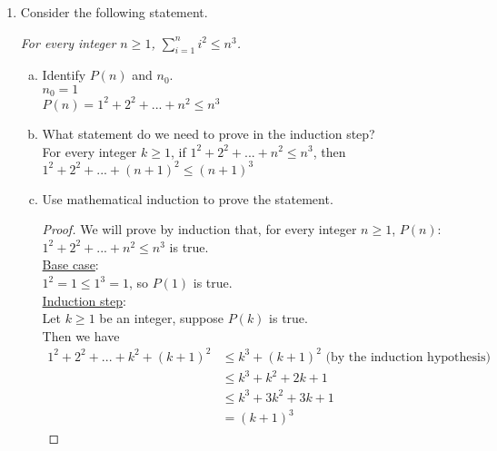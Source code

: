\documentclass[12pt]{amsart}
\begin{document}
\begin{enumerate}[{\bfseries 1.}]
\newpage
\item Consider the following statement.

	\vspace{0.1in}
	\begin{center}
	\noindent
	\textit{For every integer $n\geq 1$, $\displaystyle\sum_{i=1}^{n}i^{2}\leq n^{3}$.}
	\end{center}

	\begin{enumerate}[(a)]
	\vspace{0.1in}
	\item Identify $P(n)$ and $n_{0}$.
		\\$n_{0} = 1$
	    \\$P(n) = 1^2 + 2^2 + ... + n^2 \leq n^3$

	\vspace{0.1in}
	\item What statement do we need to prove in the induction step?
		\vspace{0.1in}
    	\\For every integer $k\geq 1$, if $1^2 + 2^2 + ... + n^2 \leq n^3$, then $1^2 + 2^2 + ... + (n+1)^2 \leq (n+1)^3$

	\vspace{0.1in}
	\item Use mathematical induction to prove the statement.
		\begin{proof}
    	\vspace{0.1in}
    	We will prove by induction that, for every integer $n \geq 1$, $P(n)$: $1^2 + 2^2 + ... + n^2 \leq n^3$ is true.
    	\\\underline{Base case}:
    	\\$1^2 = 1 \leq 1^3 = 1$, so $P(1)$ is true.
    	\\\underline{Induction step}:
    	\\Let $k\geq 1$ be an integer, suppose $P(k)$ is true.
    	\\Then we have
		\begin{align*}
		1^2 + 2^2 + ... + k^2 + (k+1)^2 &\leq k^3 + (k+1)^2 \text{ (by the induction hypothesis)} \\
		&\leq k^3 + k^2 + 2k + 1\\
		&\leq k^3 + 3k^2 + 3k + 1  \\
		&= (k+1)^3
		\end{align*}
		\end{proof}
	\end{enumerate}
\end{enumerate}
\end{document}
